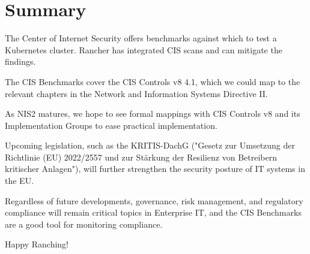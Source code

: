 %
%

\pagebreak
\section{Summary}

\onehalfspacing

The Center of Internet Security offers benchmarks against which to test a Kubernetes cluster. Rancher has integrated CIS scans and can mitigate the findings.

The CIS Benchmarks cover the CIS Controls v8 4.1, which we could map to the relevant chapters in the Network and Information Systems Directive II.

As NIS2 matures, we hope to see formal mappings with CIS Controls v8 and its Implementation Groups to ease practical implementation.

Upcoming legislation, such as the KRITIS-DachG ("Gesetz zur Umsetzung der Richtlinie (EU) 2022/2557 und zur Stärkung der Resilienz von Betreibern kritischer Anlagen"), will further strengthen the security posture of IT systems in the EU.

Regardless of future developments, governance, risk management, and regulatory compliance will remain critical topics in Enterprise IT, and the CIS Benchmarks are a good tool for monitoring compliance.

Happy Ranching!
